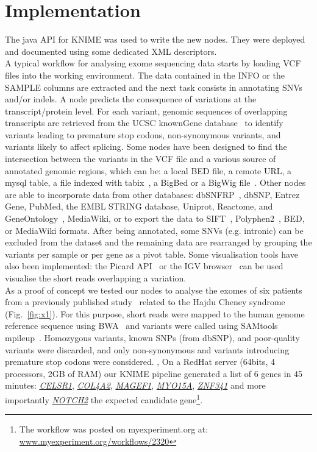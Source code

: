 \documentclass{bioinfo}
\begin{document}
\section{Implementation}

The java API for KNIME was used to write the new nodes. They were deployed and documented using some dedicated XML descriptors.
\\
A typical workflow for analysing exome sequencing data starts by loading VCF files into the working environment. The data contained in the INFO or the SAMPLE columns are extracted and the next task consists in annotating SNVs and/or indels. A node predicts the consequence of variations at the transcript/protein level. For each variant, genomic sequences of overlapping transcripts are retrieved from the UCSC knownGene database~\citep{pmid16500937} to identify variants leading to premature stop codons, non-synonymous variants, and variants likely to affect splicing.  Some nodes have been designed to find the intersection between the variants in the VCF file and a various source of annotated genomic regions, which can be: a local BED file, a remote URL, a mysql table, a file indexed with tabix~\citep{pmid21208982}, a BigBed or a BigWig file~\citep{pmid20639541}. Other nodes are able to incorporate data from other databases: dbSNFRP~\citep{pmid21520341}, dbSNP, Entrez Gene, PubMed, the EMBL STRING database, Uniprot, Reactome, and GeneOntology~\citep{pmid17098935}, MediaWiki, or to export the data to SIFT~\citep{pmid11337480}, Polyphen2~\citep{pmid20354512}, BED, or MediaWiki formats. After being annotated, some SNVs (e.g. intronic) can be excluded from the dataset and the remaining data are rearranged by grouping the variants per sample or per gene as a pivot table. Some visualisation tools have also been implemented: the Picard API~\citep{pmid19505943} or the IGV browser~\citep{pmid21221095} can be used visualise the short reads overlapping a variation.
\\
As a proof of concept we tested our nodes to analyse the exomes of six patients from a previously published study~\citep{pmid21378989} related to the Hajdu Cheney syndrome (Fig.~\ref{fig:x1}). For this purpose, short reads were mapped to the human genome reference sequence using BWA~\citep{pmid20080505} and variants were called using SAMtools mpileup~\citep{pmid19505943}. Homozygous variants, known SNPs (from dbSNP), and poor-quality variants were discarded, and only non-synonymous and variants introducing premature stop codons were considered. , On a RedHat server (64bits, 4 processors, 2GB of RAM) our KNIME pipeline generated a list of 6 genes in 45 minutes: \href{http://www.ncbi.nlm.nih.gov/gene/9620}{\textit{CELSR1}},  \href{http://www.ncbi.nlm.nih.gov/gene/1284}{\textit{COL4A2}}, \href{http://www.ncbi.nlm.nih.gov/gene/64110}{\textit{MAGEF1}}, \href{http://www.ncbi.nlm.nih.gov/gene/51168}{\textit{MYO15A}}, \href{http://www.ncbi.nlm.nih.gov/gene/84905}{\textit{ZNF341}} and more importantly \href{http://www.ncbi.nlm.nih.gov/gene/4853}{\textit{NOTCH2}} the expected candidate gene\footnote{The workflow was posted on myexperiment.org at: \href{http://www.myexperiment.org/workflows/2320.html}{www.myexperiment.org/workflows/2320}}.
\end{document}
